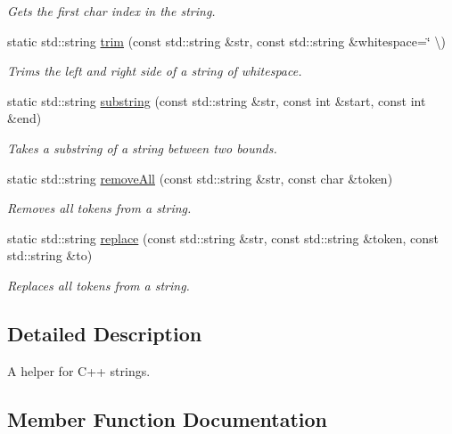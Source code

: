 \begin{DoxyCompactItemize}
\begin{DoxyCompactList}\small\item\em Gets the first char index in the string. \end{DoxyCompactList}\item 
static std\+::string \hyperlink{classflounder_1_1helperstring_a5398a40db12d52aebe7816643a6c3ce8}{trim} (const std\+::string \&str, const std\+::string \&whitespace=\char`\"{} \textbackslash{})
\begin{DoxyCompactList}\small\item\em Trims the left and right side of a string of whitespace. \end{DoxyCompactList}\item 
static std\+::string \hyperlink{classflounder_1_1helperstring_a56efb1e2a2153b52a537c27749eeb608}{substring} (const std\+::string \&str, const int \&start, const int \&end)
\begin{DoxyCompactList}\small\item\em Takes a substring of a string between two bounds. \end{DoxyCompactList}\item 
static std\+::string \hyperlink{classflounder_1_1helperstring_a8e9dfff09ae9a525b553dffa6c1113ff}{remove\+All} (const std\+::string \&str, const char \&token)
\begin{DoxyCompactList}\small\item\em Removes all tokens from a string. \end{DoxyCompactList}\item 
static std\+::string \hyperlink{classflounder_1_1helperstring_a103cbd1a0307302480f77ae7214f830c}{replace} (const std\+::string \&str, const std\+::string \&token, const std\+::string \&to)
\begin{DoxyCompactList}\small\item\em Replaces all tokens from a string. \end{DoxyCompactList}\end{DoxyCompactItemize}


\subsection{Detailed Description}
A helper for C++ strings. 



\subsection{Member Function Documentation}
\mbox{\label{classflounder_1_1helperstring_a549c7b0afdfe5ad3825d2f813b2045f3}} 
